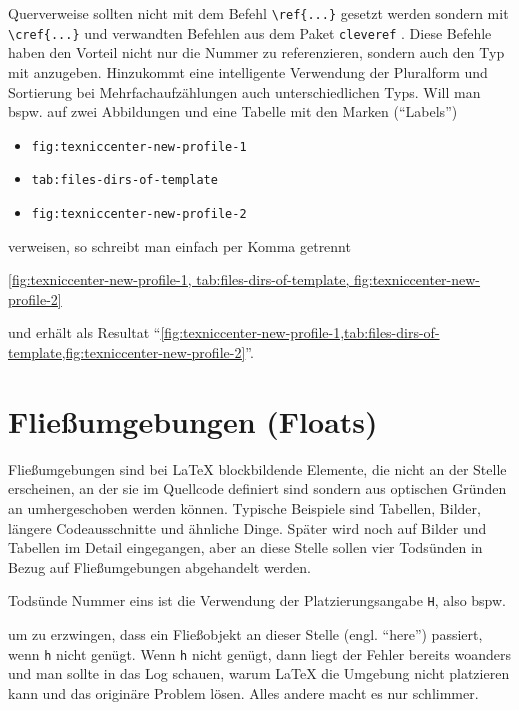 Querverweise sollten nicht mit dem Befehl \verb#\ref{...}# gesetzt werden sondern
mit \verb#\cref{...}# und verwandten Befehlen aus dem Paket \texttt{cleveref}
\parencite{Cubitt2013}. Diese Befehle haben den Vorteil nicht nur die Nummer
zu referenzieren, sondern auch den Typ mit anzugeben. Hinzukommt eine
intelligente Verwendung der Pluralform und Sortierung bei Mehrfachaufzählungen
auch unterschiedlichen Typs. Will man bspw. auf zwei Abbildungen und eine Tabelle
mit den Marken (\enquote{Labels})
\begin{itemize}
\item \texttt{fig:texniccenter-new-profile-1}
\item \texttt{tab:files-dirs-of-template}
\item \texttt{fig:texniccenter-new-profile-2}
\end{itemize}
verweisen, so schreibt man einfach per Komma getrennt
\begin{latex}[caption={Cleveres Referenzieren},label={lst:cref}]
\cref{fig:texniccenter-new-profile-1,
      tab:files-dirs-of-template,
      fig:texniccenter-new-profile-2}
\end{latex}
und erhält als Resultat \enquote{\cref{fig:texniccenter-new-profile-1,tab:files-dirs-of-template,fig:texniccenter-new-profile-2}}.

\section{Fließumgebungen (Floats)}

Fließumgebungen sind bei LaTeX blockbildende Elemente,
die nicht an der Stelle erscheinen, an der sie im Quellcode definiert sind sondern aus optischen
Gründen an umhergeschoben werden können. Typische Beispiele sind Tabellen,
Bilder, längere Codeausschnitte und ähnliche Dinge. Später wird noch auf
Bilder und Tabellen im Detail eingegangen, aber an diese Stelle sollen vier
Todsünden in Bezug auf Fließumgebungen abgehandelt werden.

Todsünde Nummer eins ist die Verwendung der Platzierungsangabe \texttt{H}, also
bspw.
\begin{latex}[caption={Verbot von \texttt{H} als Platzierungsangabe},label={lst:prohibited-h}]
\begin{figure}[H]
\end{figure}
\end{latex}
um zu erzwingen, dass ein Fließobjekt an dieser Stelle (engl. \enquote{here})
passiert, wenn \texttt{h} nicht genügt. Wenn \texttt{h} nicht genügt, dann liegt
der Fehler bereits woanders und man sollte in das Log schauen, warum LaTeX
die Umgebung nicht platzieren kann und das originäre Problem lösen. Alles andere
macht es nur schlimmer.


